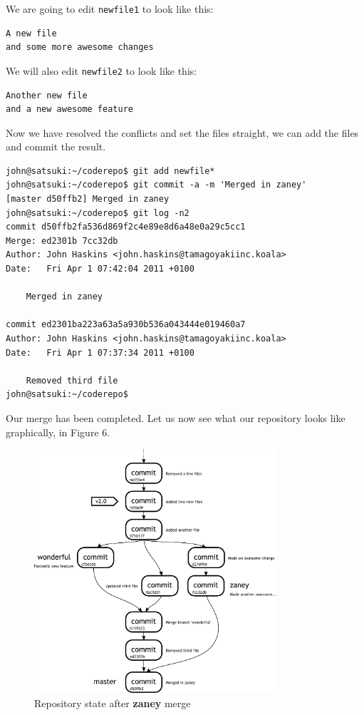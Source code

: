 We are going to edit \texttt{newfile1} to look like this:

\begin{Verbatim}
A new file
and some more awesome changes
\end{Verbatim}

We will also edit \texttt{newfile2} to look like this:

\begin{Verbatim}
Another new file
and a new awesome feature
\end{Verbatim}

Now we have resolved the conflicts and set the files straight, we can add the files and commit the result.

\begin{Verbatim}
john@satsuki:~/coderepo$ git add newfile*
john@satsuki:~/coderepo$ git commit -a -m 'Merged in zaney'
[master d50ffb2] Merged in zaney
john@satsuki:~/coderepo$ git log -n2
commit d50ffb2fa536d869f2c4e89e8d6a48e0a29c5cc1
Merge: ed2301b 7cc32db
Author: John Haskins <john.haskins@tamagoyakiinc.koala>
Date:   Fri Apr 1 07:42:04 2011 +0100

    Merged in zaney

commit ed2301ba223a63a5a930b536a043444e019460a7
Author: John Haskins <john.haskins@tamagoyakiinc.koala>
Date:   Fri Apr 1 07:37:34 2011 +0100

    Removed third file
john@satsuki:~/coderepo$
\end{Verbatim}

Our merge has been completed.
Let us now see what our repository looks like graphically, in Figure 6.

\begin{figure}[hbt]
\centering
\includegraphics[width=9cm]{images/f-w4-d6.pdf}
\caption{Repository state after \textbf{zaney} merge}
\end{figure}

